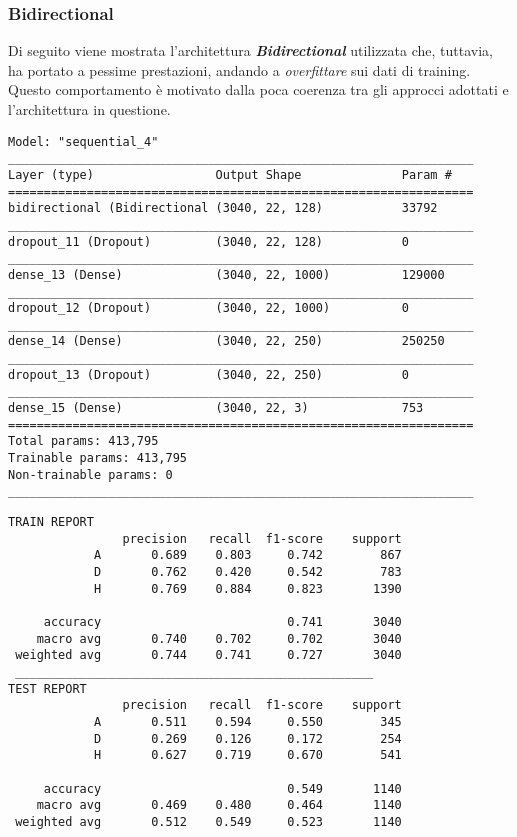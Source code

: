 \subsubsection*{Bidirectional}
Di seguito viene mostrata l'architettura \textit{\textbf{Bidirectional}} utilizzata che, tuttavia, ha portato a pessime prestazioni, andando a \textit{overfittare} sui dati di training. Questo comportamento è motivato dalla poca coerenza tra gli approcci adottati e l'architettura in questione.
\begin{lstlisting}[style=arch]
Model: "sequential_4"
_________________________________________________________________
Layer (type)                 Output Shape              Param #   
=================================================================
bidirectional (Bidirectional (3040, 22, 128)           33792     
_________________________________________________________________
dropout_11 (Dropout)         (3040, 22, 128)           0         
_________________________________________________________________
dense_13 (Dense)             (3040, 22, 1000)          129000    
_________________________________________________________________
dropout_12 (Dropout)         (3040, 22, 1000)          0         
_________________________________________________________________
dense_14 (Dense)             (3040, 22, 250)           250250    
_________________________________________________________________
dropout_13 (Dropout)         (3040, 22, 250)           0         
_________________________________________________________________
dense_15 (Dense)             (3040, 22, 3)             753       
=================================================================
Total params: 413,795
Trainable params: 413,795
Non-trainable params: 0
_________________________________________________________________

\end{lstlisting}

\begin{lstlisting}[style=report]
TRAIN REPORT
                precision   recall  f1-score    support
            A       0.689    0.803     0.742        867
            D       0.762    0.420     0.542        783
            H       0.769    0.884     0.823       1390

     accuracy                          0.741       3040
    macro avg       0.740    0.702     0.702       3040
 weighted avg       0.744    0.741     0.727       3040
 __________________________________________________
TEST REPORT
                precision   recall  f1-score    support
            A       0.511    0.594     0.550        345
            D       0.269    0.126     0.172        254
            H       0.627    0.719     0.670        541

     accuracy                          0.549       1140
    macro avg       0.469    0.480     0.464       1140
 weighted avg       0.512    0.549     0.523       1140
\end{lstlisting}


